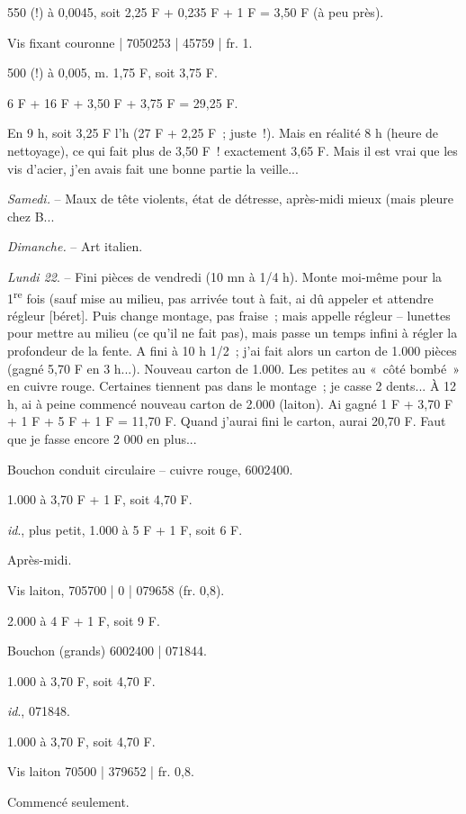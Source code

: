 \documentclass[french,twoside]{book} %
\begin{document}
550 (!) à 0,0045, soit 2,25 F + 0,235 F + 1 F = 3,50 F (à peu près).\par
Vis fixant couronne | 7050253 | 45759 | fr. 1.\par
500 (!) à 0,005, m. 1,75 F, soit 3,75 F.\par
6 F + 16 F + 3,50 F + 3,75 F = 29,25 F.\par
En 9 h, soit 3,25 F l'h (27 F + 2,25 F ; juste !). Mais en réalité 8 h (heure de nettoyage), ce qui fait plus de 3,50 F ! exactement 3,65 F. Mais il est vrai que les vis d'acier, j'en avais fait une bonne partie la veille...\par
{\itshape Samedi.} – Maux de tête violents, état de détresse, après-midi mieux (mais pleure chez B...\par
{\itshape Dimanche.} – Art italien.\par
{\itshape Lundi 22}. – Fini pièces de vendredi (10 mn à 1/4 h). Monte moi-même pour la 1\textsuperscript{re} fois (sauf mise au milieu, pas arrivée tout à fait, ai dû appeler et attendre régleur [béret]. Puis change montage, pas fraise ; mais appelle régleur – lunettes pour mettre au milieu (ce qu'il ne fait pas), mais passe un temps infini à régler la profondeur de la fente. A fini à 10 h 1/2 ; j'ai fait alors un carton de 1.000 pièces (gagné 5,70 F en 3 h...). Nouveau carton de 1.000. Les petites au « côté bombé » en cuivre rouge. Certaines tiennent pas dans le montage ; je casse 2 dents... À 12 h, ai à peine commencé nouveau carton de 2.000 (laiton). Ai gagné 1 F + 3,70 F + 1 F + 5 F + 1 F = 11,70 F. Quand j'aurai fini le carton, aurai 20,70 F. Faut que je fasse encore 2 000 en plus...\par
Bouchon conduit circulaire – cuivre rouge, 6002400.\par
1.000 à 3,70 F + 1 F, soit 4,70 F.\par
{\itshape id}., plus petit, 1.000 à 5 F + 1 F, soit 6 F.\par
Après-midi.\par
Vis laiton, 705700 | 0 | 079658 (fr. 0,8).\par
2.000 à 4 F + 1 F, soit 9 F.\par
Bouchon (grands) 6002400 | 071844.\par
1.000 à 3,70 F, soit 4,70 F.\par
{\itshape id}., 071848.\par
1.000 à 3,70 F, soit 4,70 F.\par
Vis laiton 70500 | 379652 | fr. 0,8.\par
Commencé seulement.\par
\end{document}
